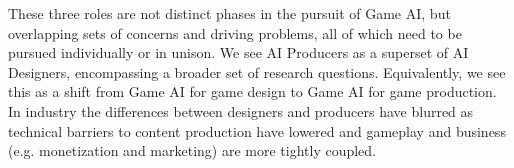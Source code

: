 \documentclass[conference]{IEEEtran}
\begin{document}
These three roles are not distinct phases in the pursuit of Game AI, but overlapping sets of concerns and driving problems, all of which need to be pursued individually or in unison.
We see AI Producers as a superset of AI Designers, encompassing a broader set of research questions. 
Equivalently, we see this as a shift from Game AI for game design to Game AI for game production. 
In industry the differences between designers and producers have blurred as technical barriers to content production have lowered and gameplay and business (e.g. monetization and marketing) are more tightly coupled.

\end{document}
